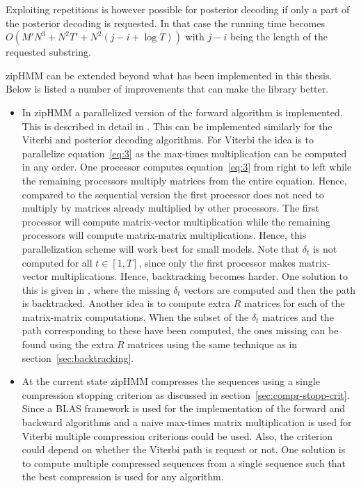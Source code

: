 Exploiting repetitions is however possible for posterior decoding if only a
part of the posterior decoding is requested. In that case the running time
becomes $O(M' N^3 + N^2 T' + N^2 (j - i + \log T))$ with $j - i$ being the
length of the requested substring.

zipHMM can be extended beyond what has been implemented in this thesis. Below
is listed a number of improvements that can make the library better.
\begin{itemize}
\item In zipHMM a parallelized version of the forward algorithm is implemented.
  This is described in detail in \citet{sand2014engineering}. This can be
  implemented similarly for the Viterbi and posterior decoding algorithms. For
  Viterbi the idea is to parallelize equation~\eqref{eq:3} as the max-times
  multiplication can be computed in any order. One processor computes
  equation~\eqref{eq:3} from right to left while the remaining processors
  multiply matrices from the entire equation. Hence, compared to the sequential
  version the first processor does not need to multiply by matrices already
  multiplied by other processors. The first processor will compute
  matrix-vector multiplication while the remaining processors will compute
  matrix-matrix multiplications. Hence, this parallelization scheme will work
  best for small models. Note that $\delta_t$ is not computed for all
  $t \in [1, T]$, since only the first processor makes matrix-vector
  multiplications. Hence, backtracking becomes harder. One solution to this is
  given in \citet{sand2014engineering}, where the missing $\delta_t$ vectors
  are computed and then the path is backtracked. Another idea is to compute
  extra $R$ matrices for each of the matrix-matrix computations. When the
  subset of the $\delta_t$ matrices and the path corresponding to these have
  been computed, the ones missing can be found using the extra $R$ matrices
  using the same technique as in section~\ref{sec:backtracking}.
\item At the current state zipHMM compresses the sequences using a single
  compression stopping criterion as discussed in
  section~\ref{sec:compr-stopp-crit}. Since a BLAS framework is used for the
  implementation of the forward and backward algorithms and a naive max-times
  matrix multiplication is used for Viterbi multiple compression criterions
  could be used. Also, the criterion could depend on whether the Viterbi path
  is request or not. One solution is to compute multiple compressed sequences
  from a single sequence such that the best compression is used for any algorithm.

\end{itemize}
